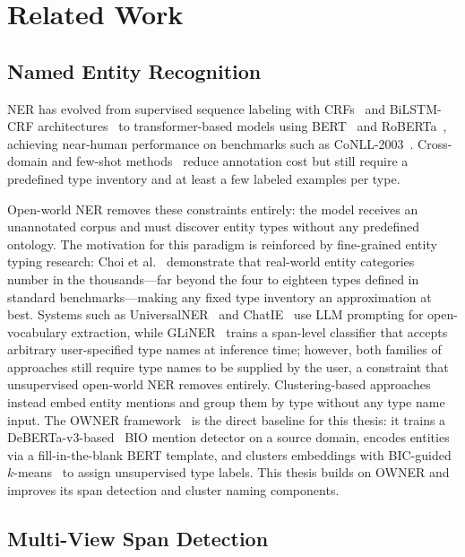 \documentclass[14pt]{extreport}
\newcommand{\nochapterspacing}[1]{%
  \cleardoublepage %
  \titlespacing*{\chapter}{0pt}{0pt}{5pt}%
  \chapter{#1}%
  \label{ch:#1}%
  \titlespacing*{\chapter}{0pt}{0pt}{5pt}%
}
\begin{document}
\nochapterspacing{Related Work}\label{ch:Work}

\section{Named Entity Recognition}

NER has evolved from supervised sequence labeling with CRFs~\cite{lafferty-etal-2001-crf} and BiLSTM-CRF architectures~\cite{ma-hovy-2016-end} to transformer-based models using BERT~\cite{devlin-etal-2019-bert} and RoBERTa~\cite{liu-etal-2019-roberta}, achieving near-human performance on benchmarks such as CoNLL-2003~\cite{tjong-kim-sang-de-meulder-2003-introduction}. Cross-domain and few-shot methods~\cite{yang-katiyar-2020-simple, ma-etal-2022-label} reduce annotation cost but still require a predefined type inventory and at least a few labeled examples per type.

Open-world NER removes these constraints entirely: the model receives an unannotated corpus and must discover entity types without any predefined ontology. The motivation for this paradigm is reinforced by fine-grained entity typing research: Choi et al.~\cite{choi-etal-2018-ultra} demonstrate that real-world entity categories number in the thousands---far beyond the four to eighteen types defined in standard benchmarks---making any fixed type inventory an approximation at best. Systems such as UniversalNER~\cite{zhou-etal-2024-universalner} and ChatIE~\cite{wei-etal-2023-chatie} use LLM prompting for open-vocabulary extraction, while GLiNER~\cite{zaratiana-etal-2023-gliner} trains a span-level classifier that accepts arbitrary user-specified type names at inference time; however, both families of approaches still require type names to be supplied by the user, a constraint that unsupervised open-world NER removes entirely. Clustering-based approaches instead embed entity mentions and group them by type without any type name input. The OWNER framework~\cite{wang-etal-2023-crossner} is the direct baseline for this thesis: it trains a DeBERTa-v3-based~\cite{he-etal-2023-debertav3} BIO mention detector on a source domain, encodes entities via a fill-in-the-blank BERT template, and clusters embeddings with BIC-guided $k$-means~\cite{macqueen-1967-kmeans, schwarz-1978-bic} to assign unsupervised type labels. This thesis builds on OWNER and improves its span detection and cluster naming components.

\section{Multi-View Span Detection}
\end{document}
